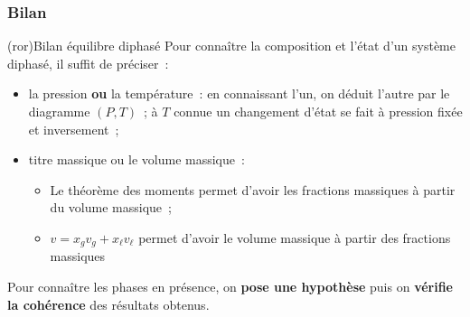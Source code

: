\documentclass[../../main/main.tex]{subfiles}
\begin{document}
\subsubsection{Bilan}
\begin{tcb*}(ror){Bilan équilibre diphasé}
	Pour connaître la composition et l'état d'un système diphasé, il suffit de
	préciser~:
	\begin{itemize}
		\item la pression \textbf{ou} la température~: en connaissant l'un, on
		      déduit l'autre par le diagramme $(P,T)$~; à $T$ connue un changement
		      d'état se fait à pression fixée et inversement~;
		\item titre massique ou le volume massique~:
		      \begin{itemize}
			      \item Le théorème des moments permet d'avoir les fractions massiques
			            à partir du volume massique~;
			      \item $v = x_gv_g + x_{\ell}v_{\ell}$ permet d'avoir le volume
			            massique à partir des fractions massiques
		      \end{itemize}
	\end{itemize}
	Pour connaître les phases en présence, on \textbf{pose une hypothèse} puis on
	\textbf{vérifie la cohérence} des résultats obtenus.
\end{tcb*}
\end{document}
